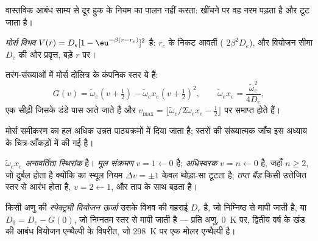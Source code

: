 वास्तविक आबंध साम्य से दूर हुक के नियम का पालन नहीं करता: खींचने पर वह नरम
पड़ता है और टूट जाता है।

\begin{definition}[मोर्स विभव]\label{def:b3:rovibrational-spectroscopy:morse}
\emph{मोर्स विभव} $V(r) = D_e[1 -
\eu^{-\beta(r - r_e)}]^2$ है: $r_e$ के निकट आवर्ती ( $2\beta^2D_e$), और
वियोजन सीमा $D_e$ की ओर प्रवृत्त, बड़े $r$ पर।
\end{definition}

\begin{proposition}[मोर्स दोलित्र के स्तर]\label{prop:b3:rovibrational-spectroscopy:morse-levels}
तरंग-संख्याओं में मोर्स दोलित्र के कंपनिक स्तर ये हैं:
\[
G(v) = \tilde\omega_e(v + \tfrac12) - \tilde\omega_ex_e(v + \tfrac12)^2, \qquad
\tilde\omega_ex_e = \frac{\tilde\omega_e^2}{4D_e},
\]
एक सीढ़ी जिसके डंडे पास आते जाते हैं और $v_{\max} = \lfloor\tilde\omega_e/
2\tilde\omega_ex_e - \frac12\rfloor$ पर समाप्त होते हैं।
\end{proposition}
\admitted

मोर्स समीकरण का हल अधिक उन्नत पाठ्यक्रमों में दिया जाता है;
स्तरों की संख्यात्मक जाँच इस अध्याय के चित्र-आँकड़ों में की गई है।

\begin{definition}\label{def:b3:rovibrational-spectroscopy:anharmonic}
$\tilde\omega_ex_e$ \emph{अनावर्तिता स्थिरांक} है।
\emph{मूल संक्रमण}
$v = 1 \leftarrow 0$ है; \emph{अधिस्वरक} $v = n \leftarrow 0$ है,
जहाँ $n \ge 2$, जो दुर्बल होता है क्योंकि  का स्थूल नियम $\Delta v = \pm1$
केवल थोड़ा-सा टूटता है; \emph{तप्त बैंड} किसी उत्तेजित स्तर से
आरंभ होता है, $v = 2 \leftarrow 1$, और ताप के साथ बढ़ता है।
\end{definition}

\begin{definition}[स्पेक्ट्रमी वियोजन ऊर्जा]\label{def:b3:rovibrational-spectroscopy:dissociation}
किसी अणु की \emph{स्पेक्ट्रमी वियोजन ऊर्जा}
उसके विभव की गहराई $D_e$ है, जो निम्निष्ठ से मापी जाती है,
या $D_0 = D_e - G(0)$, जो निम्नतम स्तर से मापी जाती है --- प्रति
अणु, \qty{0}{K} पर, द्वितीय वर्ष के खंड की आबंध वियोजन एन्थैल्पी के विपरीत,
जो \qty{298}{K} पर एक मोलर एन्थैल्पी है।
\end{definition}

